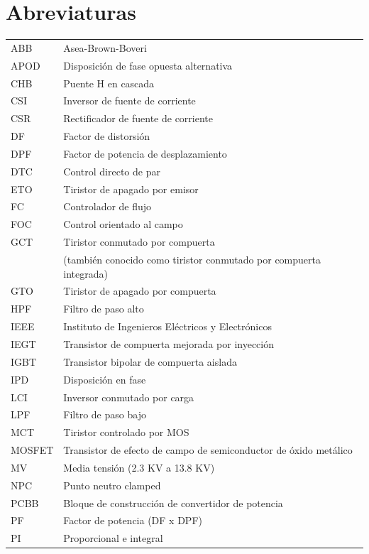 \documentclass[letterpaper,12pt]{article}
\begin{document}
\clearpage
\section*{Abreviaturas}
\footnotesize
\begin{flushleft}
\begin{tabular}{ll}
ABB & Asea-Brown-Boveri \\
APOD & Disposición de fase opuesta alternativa \\
CHB & Puente H en cascada \\
CSI & Inversor de fuente de corriente \\
CSR & Rectificador de fuente de corriente \\
DF & Factor de distorsión \\
DPF & Factor de potencia de desplazamiento \\
DTC & Control directo de par \\
ETO & Tiristor de apagado por emisor \\
FC & Controlador de flujo \\
FOC & Control orientado al campo \\
GCT & Tiristor conmutado por compuerta \\
& (también conocido como tiristor conmutado por compuerta integrada) \\
GTO & Tiristor de apagado por compuerta \\
HPF & Filtro de paso alto \\
IEEE & Instituto de Ingenieros Eléctricos y Electrónicos \\
IEGT & Transistor de compuerta mejorada por inyección \\
IGBT & Transistor bipolar de compuerta aislada \\
IPD & Disposición en fase \\
LCI & Inversor conmutado por carga \\
LPF & Filtro de paso bajo \\
MCT & Tiristor controlado por MOS \\
MOSFET & Transistor de efecto de campo de semiconductor de óxido metálico \\
MV & Media tensión (2.3 KV a 13.8 KV) \\
NPC & Punto neutro clamped \\
PCBB & Bloque de construcción de convertidor de potencia \\
PF & Factor de potencia (DF x DPF) \\
PI & Proporcional e integral \\

\end{tabular}
\end{flushleft}
\end{document}

